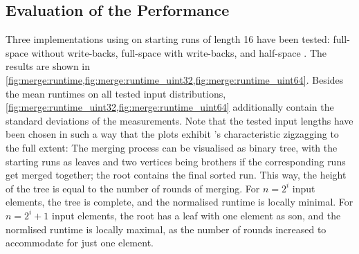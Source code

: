 \subsection*{Evaluation of the Performance}
\label{sec:tasklet:merge:performance}


Three implementations using \IS{} on starting runs of length 16 have been tested:
full-space \MS{} without write-backs, full-space \MS{} with write-backs, and half-space \MS{}.
The results are shown in \cref{fig:merge:runtime,fig:merge:runtime_uint32,fig:merge:runtime_uint64}.
Besides the mean runtimes on all tested input distributions, \cref{fig:merge:runtime_uint32,fig:merge:runtime_uint64} additionally contain the standard deviations of the measurements.
Note that the tested input lengths have been chosen in such a way that the plots exhibit \MS{}'s characteristic zigzagging to the full extent:
The merging process can be visualised as binary tree, with the starting runs as leaves and two vertices being brothers if the corresponding runs get merged together;
the root contains the final sorted run.
This way, the height of the tree is equal to the number of rounds of merging.
For \(n = 2^i\) input elements, the tree is complete, and the normalised runtime is locally minimal.
For \(n = 2^i + 1\) input elements, the root has a leaf with one element as son, and the normlised runtime is locally maximal, as the number of rounds increased to accommodate for just one element.

